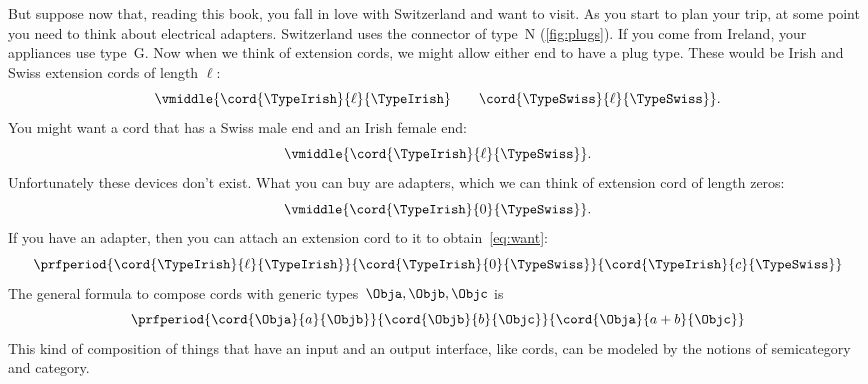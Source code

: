 But suppose now that, reading this book, you fall in love with Switzerland and want to visit.
As you start to plan your trip, at some point you need to think about electrical adapters.
Switzerland uses the connector of type~N (\cref{fig:plugs}).
If you come from Ireland, your appliances use type~G.
Now when we think of extension cords, we might allow either end to have a plug type.
%
These would be Irish and Swiss extension cords of length $\ell$:
%
\begin{equation}
    \label{eq:irish-swiss}
    \vmiddle{\cord{\TypeIrish}{\ell}{\TypeIrish} \qquad \cord{\TypeSwiss}{\ell}{\TypeSwiss}}.
\end{equation}
%
You might want a cord that has a Swiss male end and an Irish female end:
%
\begin{equation}
    \label{eq:want}
    \vmiddle{\cord{\TypeIrish}{\ell}{\TypeSwiss}}.
\end{equation}
%
Unfortunately these devices don't exist.
What you can buy are adapters, which we can think of extension cord of length zeros:
\begin{equation}
    \vmiddle{\cord{\TypeIrish}{0}{\TypeSwiss}}.
\end{equation}
%
If you have an adapter, then you can attach an extension cord to it to obtain~\cref{eq:want}:
%
\begin{equation}
    \label{eq:irish-swiss-result}
    \prfperiod{
        \cord{\TypeIrish}{\ell}{\TypeIrish}
    }{
        \cord{\TypeIrish}{0}{\TypeSwiss}
    }{
        \cord{\TypeIrish}{c}{\TypeSwiss}
    }
\end{equation}
%
The general formula to compose cords with generic types~$\Obja, \Objb, \Objc$ is
%
\begin{equation}
    \label{eq:cords-generic}
    \prfperiod{
        \cord{\Obja}{a}{\Objb}
    }{
        \cord{\Objb}{b}{\Objc}
    }{
        \cord{\Obja}{a+b}{\Objc}
    }
\end{equation}
%
This kind of composition of things that have an input and an output interface, like cords, can be modeled by the notions of semicategory and category.

%

%
%
%

